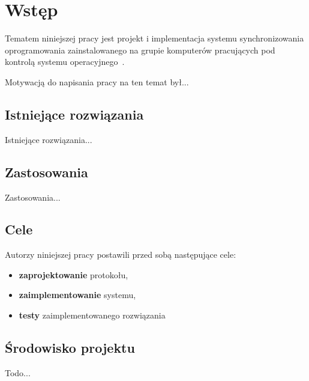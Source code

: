 \documentclass[praca_magisterska]{subfiles}
\begin{document}
\chapter{Wstęp}

Tematem niniejszej pracy jest projekt i implementacja systemu synchronizowania oprogramowania zainstalowanego na grupie komputerów pracujących pod kontrolą systemu operacyjnego~\texttt{}.

Motywacją do napisania pracy na ten temat był...

\section*{Istniejące rozwiązania}

Istniejące rozwiązania...

\section*{Zastosowania}

Zastosowania...

\section{Cele}

\noindent Autorzy niniejszej pracy postawili przed sobą następujące cele:
\begin{itemize}
	\item \textbf{zaprojektowanie} protokołu,
	\item \textbf{zaimplementowanie} systemu,
	\item \textbf{testy} zaimplementowanego rozwiązania
\end{itemize}

\newpage

\section{Środowisko projektu}

Todo...
\newpage
\end{document}
